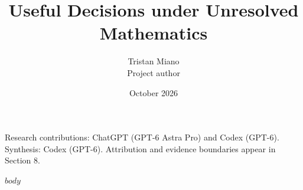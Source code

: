 \documentclass{article}
\title{Useful Decisions under Unresolved Mathematics}
\author{Tristan Miano\\Project author}
\date{October 2026}
\theoremstyle{definition}
\begin{document}
\raggedbottom
\maketitle
\begin{center}\small
Research contributions: ChatGPT (GPT-6 Astra Pro) and Codex (GPT-6).\\
Synthesis: Codex (GPT-6). Attribution and evidence boundaries appear in Section 8.
\end{center}
$body$


\end{document}
